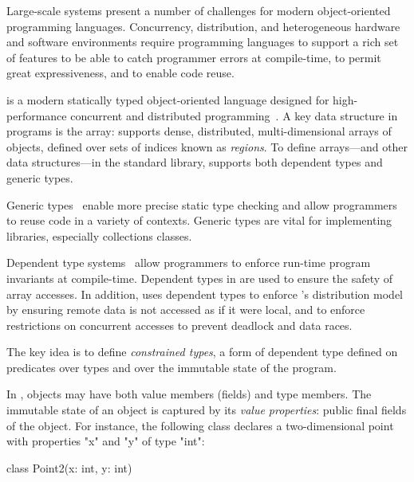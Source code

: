 
Large-scale systems present a number of challenges for modern
object-oriented programming languages.  Concurrency,
distribution, and heterogeneous hardware and software
environments require programming languages to support a rich set
of features to be able to catch programmer errors at
compile-time, to permit great expressiveness, and to enable code
reuse.

\Xten{} is a modern statically typed object-oriented language
designed for high-performance concurrent and distributed
programming~\cite{X10}.  A key data structure in \Xten{} programs
is the array: \Xten{} supports
dense,
distributed, multi-dimensional arrays of objects,
defined over sets of indices known as {\em regions}.
%
To define arrays---and other data structures---in the
\Xten{} standard library, \Xten{} supports both dependent types and
generic types. 

Generic
types~\cite{clu,ada,GJ,java-popl97,thorup97,Java3,csharp-generics}
enable more precise static type checking and allow programmers
to reuse code in a variety of contexts.  Generic types are vital
for implementing libraries, especially collections classes.

Dependent type
systems~\cite{dependent-types,xi99dependent,ocrz-ecoop03,aspinall-attapl,cayenne,epigram-matter,calc-constructions}
allow programmers to enforce run-time program invariants at
compile-time.
Dependent types in \Xten{} are used to
ensure the safety of array accesses.
In addition,
\Xten{} uses dependent types to enforce \Xten{}'s
distribution model by ensuring remote data is
not accessed as if it were local, and to enforce
restrictions on concurrent accesses to prevent deadlock and data
races.

The key idea is to define \emph{constrained types}, a form of
dependent type defined on predicates over types and over the
immutable state of the program.

In \Xten{}, objects may have both value members (fields)
and type members.
The immutable state of an object is captured by its
\emph{value properties}: public final fields of the object.
For instance, the following class declares a two-dimensional
point with properties \xcd"x" and \xcd"y" of type \xcd"int":
\begin{xten}
class Point2(x: int, y: int) { }
\end{xten}

